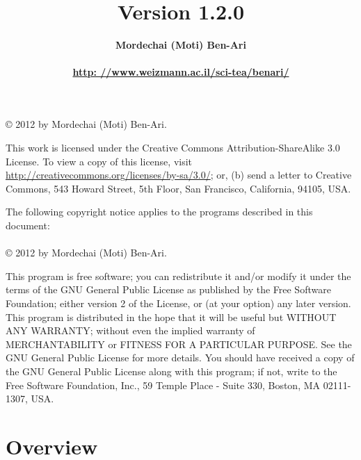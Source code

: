 \documentclass[11pt]{report}
\title{\bfseries \ls\\\mbox{}\\\mbox{}\\
\bfseries\normalsize Version 1.2.0}
\author{\bfseries Mordechai (Moti) Ben-Ari\\\mbox{}\\
\url{http: //www.weizmann.ac.il/sci-tea/benari/}}
\begin{document}
\maketitle

\thispagestyle{empty}

\vspace*{\fill}

\begin{center}
\copyright{} 2012 by Mordechai (Moti) Ben-Ari.
\end{center}
This work is licensed under the Creative Commons Attribution-ShareAlike 3.0
License. To view a copy of this license, visit
\url{http://creativecommons.org/licenses/by-sa/3.0/}; or, (b) send a letter
to Creative Commons, 543 Howard Street, 5th Floor, San Francisco,
California, 94105, USA.

\bigskip\bigskip

 
\begin{center}
The following copyright notice applies to the programs described in this
document:\mbox{}\\\mbox{}\\
\copyright{} 2012 by Mordechai (Moti) Ben-Ari.
\end{center}

This program is free software; you can redistribute it and/or
modify it under the terms of the GNU General Public License
as published by the Free Software Foundation; either version 2
of the License, or (at your option) any later version.
This program is distributed in the hope that it will be useful
but WITHOUT ANY WARRANTY; without even the implied warranty of
MERCHANTABILITY or FITNESS FOR A PARTICULAR PURPOSE.
See the GNU General Public License for more details.
You should have received a copy of the GNU General Public License
along with this program; if not, write to the Free Software
Foundation, Inc., 59 Temple Place - Suite 330, Boston, MA
02111-1307, USA.

\vspace*{\fill}

\tableofcontents

\thispagestyle{empty}

\setcounter{page}{0}

\newpage


\section*{Overview}
\end{document}
